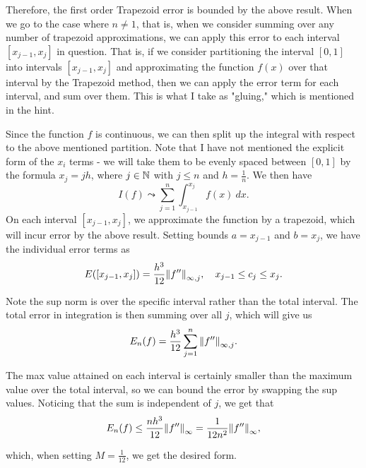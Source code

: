 \begin{solution}
    Therefore, the first order Trapezoid error is bounded by the above result. When we go to the case where $n \neq 1$, that is, when we consider summing over any number of trapezoid approximations, we can apply this error to each interval $[x_{j-1}, x_j]$ in question. That is, if we consider partitioning the interval $[0, 1]$ into intervals $[x_{j-1}, x_j]$ and approximating the function $f(x)$ over that interval by the Trapezoid method, then we can apply the error term for each interval, and sum over them. This is what I take as "gluing," which is mentioned in the hint. \par

    \jump
    Since the function $f$ is continuous, we can then split up the integral with respect to the above mentioned partition. Note that I have not mentioned the explicit form of the $x_i$ terms - we will take them to be evenly spaced between $[0, 1]$ by the formula $x_j = jh$, where $j \in \mathbb{N}$ with $j \leq n$ and $h = \frac{1}{n}$. We then have 
    \[I(f) \leadsto \sum_{j = 1}^n \int_{x_{j-1}}^{x_j} f(x) \ dx.\]
    On each interval $[x_{j-1}, x_j]$, we approximate the function by a trapezoid, which will incur error by the above result. Setting bounds $a = x_{j-1}$ and $b = x_j$, we have the individual error terms as 
    \[E([x_{j-1}, x_j]) = \frac{h^3}{12}\norm{f''}_{\infty, j}, \quad x_{j-1} \leq c_j \leq x_j.\]

    Note the sup norm is over the specific interval rather than the total interval. The total error in integration is then summing over all $j$, which will give us 
    \[E_n(f) = \frac{h^3}{12}\sum_{j = 1}^n \norm{f''}_{\infty, j}.\]

    The max value attained on each interval is certainly smaller than the maximum value over the total interval, so we can bound the error by swapping the sup values. Noticing that the sum is independent of $j$, we get that 
    \[E_n(f) \leq \frac{nh^3}{12}\norm{f''}_{\infty} = \frac{1}{12n^2}\norm{f''}_{\infty},\]

    which, when setting $M = \frac{1}{12}$, we get the desired form. 
    
\end{solution}

\newpage
